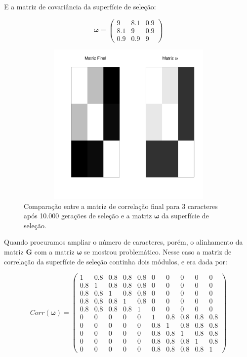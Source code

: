 E a matriz de covariância da superfície de seleção: 

\begin{equation}
    \pmb{\omega} = \left( \begin{smallmatrix} 9 & 8.1 & 0.9\\  8.1 & 9 & 0.9 \\ 0.9 & 0.9 & 9 \end{smallmatrix}  \right)
\end{equation}


\begin{figure}[htbp]
    \centering
    \includegraphics[width=150mm, height=80mm]{figuras/Mat3tracos}
    \caption{Comparação entre a matriz de correlação final para 3
        caracteres após 10.000 gerações de seleção e a matriz
        $\pmb{\omega}$ da superfície de seleção.}
    \label{MatJones3tracos}
\end{figure}


Quando procuramos ampliar o número de caracteres, porém, o alinhamento da
matriz $\mathbf{G}$ com a matriz $\pmb{\omega}$ se mostrou problemático. 
Nesse caso a matriz de correlação da superfície de seleção continha dois
módulos, e era dada por:

\begin{equation}
    Corr(\pmb{\omega}) = \left( 
    \begin{smallmatrix} 
        1 & 0.8 & 0.8 & 0.8 & 0.8 & 0 & 0 & 0 & 0 & 0\\  
      0.8 & 1 & 0.8 & 0.8 & 0.8 & 0 & 0 & 0 & 0 & 0\\  
      0.8 & 0.8 & 1 & 0.8 & 0.8 & 0 & 0 & 0 & 0 & 0\\  
      0.8 & 0.8 & 0.8 & 1 & 0.8 & 0 & 0 & 0 & 0 & 0\\  
      0.8 & 0.8 & 0.8 & 0.8 & 1 & 0 & 0 & 0 & 0 & 0\\  
        0 & 0 & 0 & 0 & 0 & 1 & 0.8 & 0.8 & 0.8 & 0.8\\ 
        0 & 0 & 0 & 0 & 0 & 0.8 & 1 & 0.8 & 0.8 & 0.8\\
        0 & 0 & 0 & 0 & 0 & 0.8 & 0.8 & 1 & 0.8 & 0.8\\
        0 & 0 & 0 & 0 & 0 & 0.8 & 0.8 & 0.8 & 1 & 0.8\\
        0 & 0 & 0 & 0 & 0 & 0.8 & 0.8 & 0.8 & 0.8 & 1
    \end{smallmatrix}  \right)
    \label{matw}
\end{equation}


